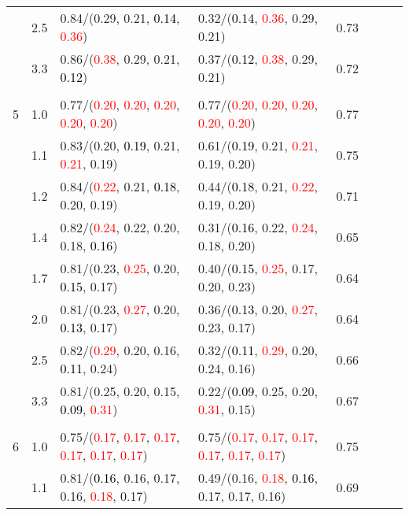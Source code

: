 \documentclass[10pt,a4paper]{report}
\begin{document}
\begin{table}[!htbp]
\begin{center}
{\begin{tabular}{ccllcccc}
			&2.5&0.84/(0.29, 0.21, \textcolor{black}{0.14}, \textcolor{red}{0.36})&0.32/(\textcolor{black}{0.14}, \textcolor{red}{0.36}, 0.29, 0.21)&0.73\\
			&3.3&0.86/(\textcolor{red}{0.38}, 0.29, 0.21, \textcolor{black}{0.12})&0.37/(\textcolor{black}{0.12}, \textcolor{red}{0.38}, 0.29, 0.21)&0.72\\
			&&&&\\
			5			&1.0&0.77/(\textcolor{red}{0.20}, \textcolor{red}{0.20}, \textcolor{red}{0.20}, \textcolor{red}{0.20}, \textcolor{red}{0.20})&0.77/(\textcolor{red}{0.20}, \textcolor{red}{0.20}, \textcolor{red}{0.20}, \textcolor{red}{0.20}, \textcolor{red}{0.20})&0.77\\
			&1.1&0.83/(0.20, \textcolor{black}{0.19}, 0.21, \textcolor{red}{0.21}, 0.19)&0.61/(\textcolor{black}{0.19}, 0.21, \textcolor{red}{0.21}, 0.19, 0.20)&0.75\\
			&1.2&0.84/(\textcolor{red}{0.22}, 0.21, \textcolor{black}{0.18}, 0.20, 0.19)&0.44/(\textcolor{black}{0.18}, 0.21, \textcolor{red}{0.22}, 0.19, 0.20)&0.71\\
			&1.4&0.82/(\textcolor{red}{0.24}, 0.22, 0.20, 0.18, \textcolor{black}{0.16})&0.31/(\textcolor{black}{0.16}, 0.22, \textcolor{red}{0.24}, 0.18, 0.20)&0.65\\
			&1.7&0.81/(0.23, \textcolor{red}{0.25}, 0.20, \textcolor{black}{0.15}, 0.17)&0.40/(\textcolor{black}{0.15}, \textcolor{red}{0.25}, 0.17, 0.20, 0.23)&0.64\\
			&2.0&0.81/(0.23, \textcolor{red}{0.27}, 0.20, \textcolor{black}{0.13}, 0.17)&0.36/(\textcolor{black}{0.13}, 0.20, \textcolor{red}{0.27}, 0.23, 0.17)&0.64\\
			&2.5&0.82/(\textcolor{red}{0.29}, 0.20, 0.16, \textcolor{black}{0.11}, 0.24)&0.32/(\textcolor{black}{0.11}, \textcolor{red}{0.29}, 0.20, 0.24, 0.16)&0.66\\
			&3.3&0.81/(0.25, 0.20, 0.15, \textcolor{black}{0.09}, \textcolor{red}{0.31})&0.22/(\textcolor{black}{0.09}, 0.25, 0.20, \textcolor{red}{0.31}, 0.15)&0.67\\
			&&&&\\
			6			&1.0&0.75/(\textcolor{red}{0.17}, \textcolor{red}{0.17}, \textcolor{red}{0.17}, \textcolor{red}{0.17}, \textcolor{red}{0.17}, \textcolor{red}{0.17})&0.75/(\textcolor{red}{0.17}, \textcolor{red}{0.17}, \textcolor{red}{0.17}, \textcolor{red}{0.17}, \textcolor{red}{0.17}, \textcolor{red}{0.17})&0.75\\
			&1.1&0.81/(\textcolor{black}{0.16}, 0.16, 0.17, 0.16, \textcolor{red}{0.18}, 0.17)&0.49/(0.16, \textcolor{red}{0.18}, \textcolor{black}{0.16}, 0.17, 0.17, 0.16)&0.69\\

\end{tabular}}
\end{center}
\end{table}
\end{document}

